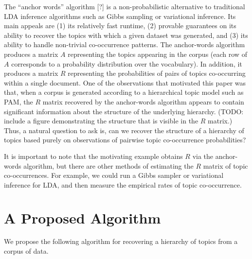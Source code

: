\documentclass{article}
\theoremstyle{definition}
\newcommand{\tocite}{[?]}
\begin{document}
The ``anchor words'' algorithm \tocite{} is a non-probabilistic alternative to traditional LDA inference algorithms such as Gibbs sampling or variational inference.
Its main appeals are (1) its relatively fast runtime, (2) provable guarantees on its ability to recover the topics with which a given dataset was generated, and (3) its ability to handle non-trivial co-occurrence patterns.
The anchor-words algorithm produces a matrix $A$ representing the topics appearing in the corpus (each row of $A$ corresponds to a probability distribution over the vocabulary).
In addition, it produces a matrix $R$ representing the probabilities of pairs of topics co-occurring within a single document.
One of the observations that motivated this paper was that, when a corpus is generated according to a hierarchical topic model such as PAM, the $R$ matrix recovered by the anchor-words algorithm appears to contain significant information about the structure of the underlying hierarchy.
(TODO: include a figure demonstrating the structure that is visible in the $R$ matrix.)
Thus, a natural question to ask is, can we recover the structure of a hierarchy of topics based purely on observations of pairwise topic co-occurrence probabilities?

It is important to note that the motivating example obtains $R$ via the anchor-words algorithm, but there are other methods of estimating the $R$ matrix of topic co-occurrences.
For example, we could run a Gibbs sampler or variational inference for LDA, and then measure the empirical rates of topic co-occurrence.

\section{A Proposed Algorithm}

We propose the following algorithm for recovering a hierarchy of topics from a corpus of data.

\newcommand{\Rbar}{\overline{R}}
\end{document}
